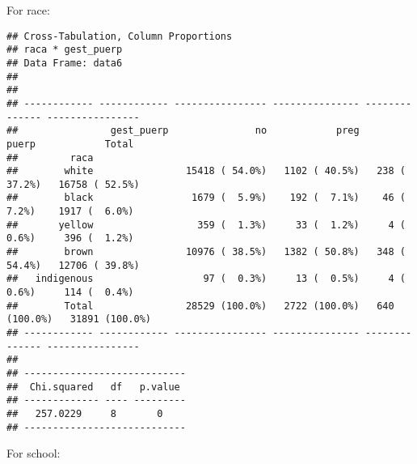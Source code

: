 \documentclass[
]{article}
\newenvironment{Shaded}{\begin{snugshade}}{\end{snugshade}}
\newcommand{\DataTypeTok}[1]{\textcolor[rgb]{0.13,0.29,0.53}{#1}}
\newcommand{\KeywordTok}[1]{\textcolor[rgb]{0.13,0.29,0.53}{\textbf{#1}}}
\newcommand{\NormalTok}[1]{#1}
\newcommand{\OperatorTok}[1]{\textcolor[rgb]{0.81,0.36,0.00}{\textbf{#1}}}
\newcommand{\OtherTok}[1]{\textcolor[rgb]{0.56,0.35,0.01}{#1}}
\newcommand{\StringTok}[1]{\textcolor[rgb]{0.31,0.60,0.02}{#1}}
\begin{document}
For race:

\begin{Shaded}
\end{Shaded}

\begin{verbatim}
## Cross-Tabulation, Column Proportions  
## raca * gest_puerp  
## Data Frame: data6  
## 
## 
## ------------ ------------ ---------------- --------------- -------------- ----------------
##                gest_puerp               no            preg          puerp            Total
##         raca                                                                              
##        white                15418 ( 54.0%)   1102 ( 40.5%)   238 ( 37.2%)   16758 ( 52.5%)
##        black                 1679 (  5.9%)    192 (  7.1%)    46 (  7.2%)    1917 (  6.0%)
##       yellow                  359 (  1.3%)     33 (  1.2%)     4 (  0.6%)     396 (  1.2%)
##        brown                10976 ( 38.5%)   1382 ( 50.8%)   348 ( 54.4%)   12706 ( 39.8%)
##   indigenous                   97 (  0.3%)     13 (  0.5%)     4 (  0.6%)     114 (  0.4%)
##        Total                28529 (100.0%)   2722 (100.0%)   640 (100.0%)   31891 (100.0%)
## ------------ ------------ ---------------- --------------- -------------- ----------------
## 
## ----------------------------
##  Chi.squared   df   p.value 
## ------------- ---- ---------
##   257.0229     8       0    
## ----------------------------
\end{verbatim}

For school:

\begin{Shaded}
\end{Shaded}
\end{document}
